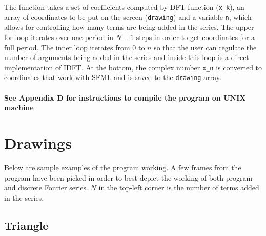 \documentclass[titlepage]{article}
\begin{document}
    The function takes a set of coefficients computed by DFT function (\texttt{x\_k}),
    an array of coordinates to be put on the screen (\texttt{drawing}) and a variable
    \texttt{n}, which allows for controlling how many terms are being added in the 
    series. The upper for loop iterates over one period in $N-1$ steps in order
    to get coordinates for a full period. The inner loop iterates from $0$ to $n$
    so that the user can regulate the number of arguments being added in the series
    and inside this loop is a direct implementation of IDFT. At the bottom, the 
    complex number \texttt{x\_n} is converted to coordinates that work with SFML 
    and is saved to the \texttt{drawing} array. 
    \paragraph{See Appendix D for instructions to compile the program on UNIX
    machine}

\section{Drawings}

    Below are sample examples of the program working. A few frames from the 
    program have been picked in order to best depict the working of both program
    and discrete Fourier series. $N$ in the top-left corner is the number of
    terms added in the series.

\subsection{Triangle}
\end{document}
